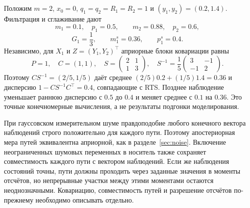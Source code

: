 \subsection{}
{Положим $m=2$, $x_0=0$, $q_1=q_2=R_1=R_2=1$ и $(y_1,y_2)=(0.2,1.4)$. Фильтрация и сглаживание дают}
\[
m_1=0.1,\quad p_1=0.5,\qquad m_2=0.88,\quad p_2=0.6,
\]
\[
G_1=\frac13,\qquad m_1^s=0.36,\qquad p_1^s=0.4.
\]
{Независимо, для $X_1$ и $Z=(Y_1,Y_2)^\top$ априорные блоки ковариации равны}
\[
P=1,\quad C=(1,1),\quad
S=\begin{pmatrix}2&1\\1&3\end{pmatrix},\quad
S^{-1}=\frac15\begin{pmatrix}3&-1\\-1&2\end{pmatrix}.
\]
{Поэтому $CS^{-1}=(2/5,1/5)$ даёт среднее $(2/5)0.2+(1/5)1.4=0.36$ и дисперсию $1-CS^{-1}C^\top=0.4$, совпадающие с RTS. Позднее наблюдение уменьшает раннюю дисперсию с $0.5$ до $0.4$ и меняет среднее с $0.1$ на $0.36$. Это точные конечномерные вычисления, а не результаты подгонки моделирования.}

{При гауссовском измерительном шуме правдоподобие любого конечного вектора наблюдений строго положительно для каждого пути. Поэтому апостериорная мера путей эквивалентна априорной, как в разделе~\ref{sec:noise}. Включение неограниченных шумовых переменных в носитель также сохраняет совместимость каждого пути с вектором наблюдений. Если же наблюдения состояний точны, пути должны проходить через заданные значения в моменты отсчётов, но непрерывные участки между этими моментами остаются неоднозначными. Ковариацию, совместимость путей и разрешение отсчётов по-прежнему необходимо описывать отдельно.}

